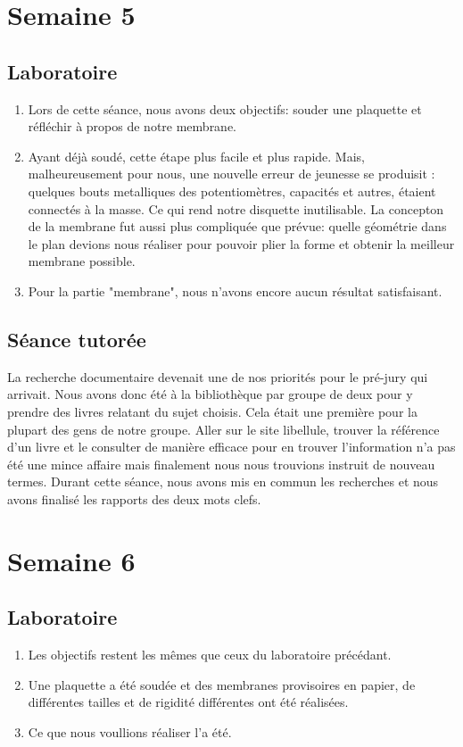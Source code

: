 \documentclass{article}
\begin{document}
\section{Semaine 5}
\subsection{Laboratoire}
\begin{enumerate}
	\item Lors de cette séance, nous avons deux objectifs: souder une plaquette et réfléchir à propos de notre membrane.
	\item Ayant déjà soudé, cette étape plus facile et plus rapide. Mais, malheureusement pour nous, une nouvelle erreur 
				de jeunesse se produisit : quelques bouts metalliques des potentiomètres, capacités et autres, étaient connectés à la masse. 
				Ce qui rend notre disquette inutilisable. 
				La concepton de la membrane fut aussi plus compliquée que prévue: quelle géométrie dans le plan devions nous réaliser pour 
				pouvoir plier la forme et obtenir la meilleur membrane possible.
	\item Pour la partie "membrane", nous n'avons encore aucun résultat satisfaisant. 
\end{enumerate}

\subsection{Séance tutorée}
La recherche documentaire devenait une de nos priorités pour le pré-jury qui arrivait.  Nous avons donc été à la bibliothèque par groupe de deux pour y prendre des livres relatant du sujet choisis.  Cela était une première pour la plupart des gens de notre groupe.  Aller sur le site libellule, trouver la référence d’un livre et le consulter de manière efficace pour en trouver l’information n’a pas été une mince affaire mais finalement nous nous trouvions instruit de nouveau termes.  Durant cette séance, nous avons mis en commun les recherches et nous avons finalisé les rapports des deux mots clefs.  

\section{Semaine 6}
\subsection{Laboratoire}
\begin{enumerate}
	\item Les objectifs restent les mêmes que ceux du laboratoire précédant.
	\item Une plaquette a été soudée et des membranes provisoires en papier, de différentes tailles et de rigidité différentes ont été réalisées.
	\item Ce que nous voullions réaliser l'a été. 
\end{enumerate}
\end{document}
